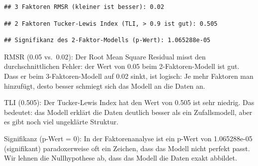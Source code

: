 \documentclass[
]{article}
\newenvironment{Shaded}{\begin{snugshade}}{\end{snugshade}}
\newcommand{\CommentTok}[1]{\textcolor[rgb]{0.56,0.35,0.01}{\textit{#1}}}
\newcommand{\DecValTok}[1]{\textcolor[rgb]{0.00,0.00,0.81}{#1}}
\newcommand{\FunctionTok}[1]{\textcolor[rgb]{0.13,0.29,0.53}{\textbf{#1}}}
\newcommand{\NormalTok}[1]{#1}
\newcommand{\SpecialCharTok}[1]{\textcolor[rgb]{0.81,0.36,0.00}{\textbf{#1}}}
\newcommand{\StringTok}[1]{\textcolor[rgb]{0.31,0.60,0.02}{#1}}
\begin{document}
\begin{verbatim}
## 3 Faktoren RMSR (kleiner ist besser): 0.02
\end{verbatim}

\begin{Shaded}
\end{Shaded}

\begin{verbatim}
## 2 Faktoren Tucker-Lewis Index (TLI, > 0.9 ist gut): 0.505
\end{verbatim}

\begin{Shaded}
\end{Shaded}

\begin{verbatim}
## Signifikanz des 2-Faktor-Modells (p-Wert): 1.065288e-05
\end{verbatim}

RMSR (0.05 vs.~0.02): Der Root Mean Square Residual misst den
durchschnittlichen Fehler: der Wert von 0.05 beim 2-Faktoren-Modell ist
gut. Dass er beim 3-Faktoren-Modell auf 0.02 sinkt, ist logisch: Je mehr
Faktoren man hinzufügt, desto besser schmiegt sich das Modell an die
Daten an.

TLI (0.505): Der Tucker-Lewis Index hat den Wert von 0.505 ist sehr
niedrig. Das bedeutet: das Modell erklärt die Daten deutlich besser als
ein Zufallsmodell, aber es gibt noch viel ungeklärte Struktur.

Signifikanz (p-Wert = 0): In der Faktorenanalyse ist ein p-Wert von
1.065288e-05 (signifikant) paradoxerweise oft ein Zeichen, dass das
Modell nicht perfekt passt. Wir lehnen die Nullhypothese ab, dass das
Modell die Daten exakt abbildet.
\end{document}
